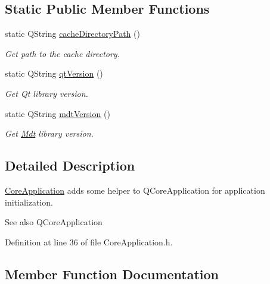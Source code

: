 \subsection*{Static Public Member Functions}
\begin{DoxyCompactItemize}
\item 
static Q\+String \hyperlink{class_mdt_1_1_core_application_aa5bf79da0eda7f8dedd2b78bf8025449}{cache\+Directory\+Path} ()
\begin{DoxyCompactList}\small\item\em Get path to the cache directory. \end{DoxyCompactList}\item 
static Q\+String \hyperlink{class_mdt_1_1_core_application_a0509073283a3a23e4ee3cf248739e15c}{qt\+Version} ()\hypertarget{class_mdt_1_1_core_application_a0509073283a3a23e4ee3cf248739e15c}{}\label{class_mdt_1_1_core_application_a0509073283a3a23e4ee3cf248739e15c}

\begin{DoxyCompactList}\small\item\em Get Qt library version. \end{DoxyCompactList}\item 
static Q\+String \hyperlink{class_mdt_1_1_core_application_a43d5e4e3b163250cba37c0071fb9f7ea}{mdt\+Version} ()\hypertarget{class_mdt_1_1_core_application_a43d5e4e3b163250cba37c0071fb9f7ea}{}\label{class_mdt_1_1_core_application_a43d5e4e3b163250cba37c0071fb9f7ea}

\begin{DoxyCompactList}\small\item\em Get \hyperlink{namespace_mdt}{Mdt} library version. \end{DoxyCompactList}\end{DoxyCompactItemize}


\subsection{Detailed Description}
\hyperlink{class_mdt_1_1_core_application}{Core\+Application} adds some helper to Q\+Core\+Application for application initialization. 

\begin{DoxySeeAlso}{See also}
Q\+Core\+Application 
\end{DoxySeeAlso}


Definition at line 36 of file Core\+Application.\+h.



\subsection{Member Function Documentation}
